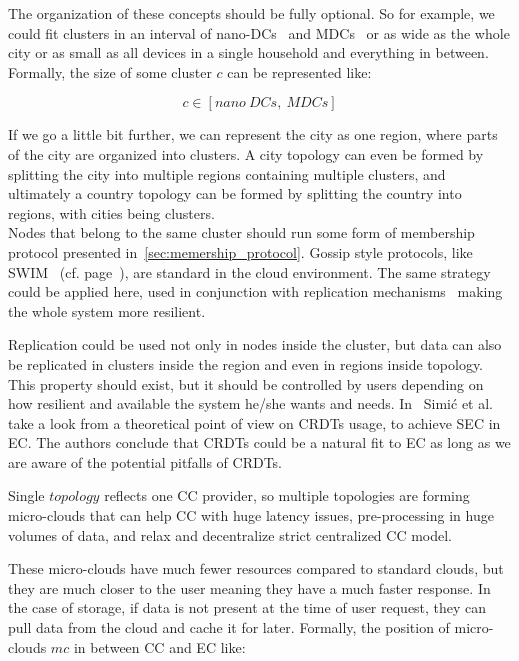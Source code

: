The organization of these concepts should be fully optional. So for example, we could fit clusters in an interval of nano-DCs~\cite{inbookKurniawan} and MDCs~\cite{GreenbergHMP09} or as wide as the whole city or as small as all devices in a single household and everything in between. Formally, the size of some cluster $c$ can be represented like:

\begin{equation}
	c \in \left[ nano\ DCs,\ MDCs \right]
\end{equation}

\noindent
If we go a little bit further, we can represent the city as one region, where parts of the city are organized into clusters. A city topology can even be formed by splitting the city into multiple regions containing multiple clusters, and ultimately a country topology can be formed by splitting the country into regions, with cities being clusters.\\

Nodes that belong to the same cluster should run some form of membership protocol presented in~\ref{sec:memership_protocol}. Gossip style protocols, like SWIM~\cite{DasGM02} (cf. page~\pageref{swim}), are standard in the cloud environment. The same strategy could be applied here, used in conjunction with replication mechanisms~\cite{LiBCL20, CauCBFCEB16, CRDTS_Nuno} making the whole system more resilient. 

Replication could be used not only in nodes inside the cluster, but data can also be replicated in clusters inside the region and even in regions inside topology. This property should exist, but it should be controlled by users depending on how resilient and available the system he/she wants and needs. In~\cite{inproceedingsSimic2} Simi\' c et al. take a look from a theoretical point of view on CRDTs usage, to achieve SEC in EC. The authors conclude that CRDTs could be a natural fit to EC as long as we are aware of the potential pitfalls of CRDTs.

Single $topology$ reflects one CC provider, so multiple topologies are forming micro-clouds that can help CC with huge latency issues, pre-processing in huge volumes of data, and relax and decentralize strict centralized CC model.

These micro-clouds have much fewer resources compared to standard clouds, but they are much closer to the user meaning they have a much faster response. In the case of storage, if data is not present at the time of user request, they can pull data from the cloud and cache it for later. Formally, the position of micro-clouds $mc$ in between CC and EC like:

